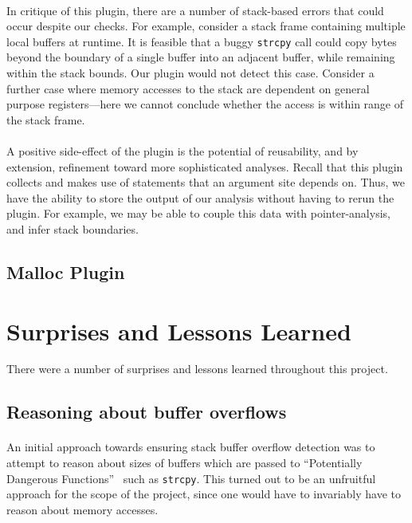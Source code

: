 \documentclass[letterpaper,11pt]{article}
\begin{document}
\paragraph{}
In critique of this plugin, there are a number of stack-based errors that could
occur despite our checks. For example, consider a stack frame containing
multiple local buffers at runtime. It is feasible that a buggy \texttt{strcpy}
call could copy bytes beyond the boundary of a single buffer into an adjacent
buffer, while remaining within the stack bounds. Our plugin would not detect
this case. Consider a further case where memory accesses to the stack
are dependent on general purpose registers---here we cannot conclude
whether the access is within range of the stack frame.

\paragraph{}
A positive side-effect of the plugin is the potential of reusability, and by
extension, refinement toward more sophisticated analyses. Recall that this
plugin collects and makes use of statements that an argument site depends on.
Thus, we have the ability to store the output of our analysis without having to
rerun the plugin. For example, we may be able to couple this data with
pointer-analysis, and infer stack boundaries.

\subsection{Malloc Plugin}


\section{Surprises and Lessons Learned}
\label{lessonslearned}

There were a number of surprises and lessons learned throughout this project.

\subsection{Reasoning about buffer overflows}

\paragraph{}
An initial approach towards ensuring stack buffer overflow detection was to
attempt to reason about sizes of buffers which are passed to ``Potentially
Dangerous Functions''~\cite{seacord2008cert} such as \texttt{strcpy}. This
turned out to be an unfruitful approach for the scope of the project, since one
would have to invariably have to reason about memory accesses.
\end{document}

